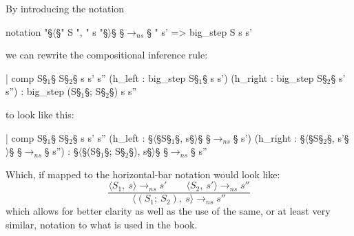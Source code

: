 By introducing the notation
\begin{Lean_Code}
notation "§\color{purple}\(\langle\)§" S ", " s "§\color{purple}\(\rangle\)§ §\color{purple}\(\to_{ns}\)§ " s' => big_step S s s'
\end{Lean_Code}
we can rewrite the compositional inference rule:
\begin{Lean_Code}
    | comp {S§\(_1\)§ S§\(_2\)§ s s' s''}
        (h_left  : big_step S§\(_1\)§ s s')
        (h_right : big_step S§\(_2\)§ s' s'') :
            big_step (S§\(_1\)§; S§\(_2\)§) s s''
\end{Lean_Code}
to look like this:
\begin{Lean_Code}
    | comp {S§\(_1\)§ S§\(_2\)§ s s' s''}
        (h_left  : §\(\langle\)§S§\(_1\)§, s§\(\rangle\)§ §\(\to_{ns}\)§ s')
        (h_right : §\(\langle\)§S§\(_2\)§, s'§\(\rangle\)§ §\(\to_{ns}\)§ s'') :
            §\(\langle\)§(S§\(_1\)§; S§\(_2\)§), s§\(\rangle\)§ §\(\to_{ns}\)§ s''
\end{Lean_Code}
Which, if mapped to the horizontal-bar notation would look like:
\[
\frac{\langle S_1,\ s\rangle \to_{ns} s' \qquad \langle S_2,\ s'\rangle \to_{ns} s''}{\langle (S_1;\ S_2),\ s\rangle \to_{ns} s''}
\]
which allows for better clarity as well as the use of the same,
or at least very similar, notation to what is used in the book.
